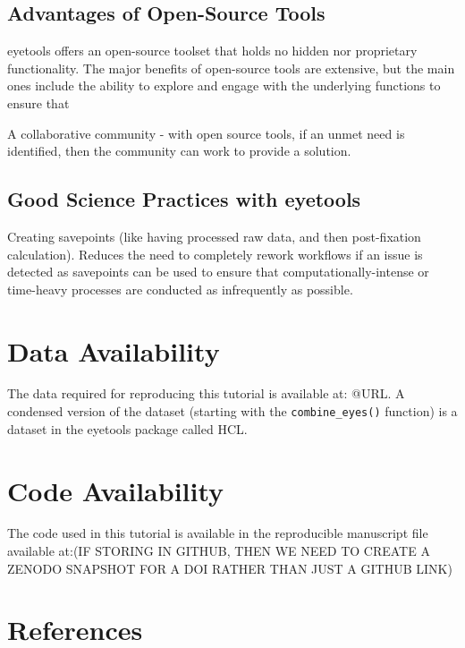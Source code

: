 \documentclass[
  man,
  floatsintext,
  longtable,
  nolmodern,
  notxfonts,
  notimes,
  colorlinks=true,linkcolor=blue,citecolor=blue,urlcolor=blue]{apa7}
\begin{document}
\subsection{Advantages of Open-Source
Tools}\label{advantages-of-open-source-tools}

eyetools offers an open-source toolset that holds no hidden nor
proprietary functionality. The major benefits of open-source tools are
extensive, but the main ones include the ability to explore and engage
with the underlying functions to ensure that

A collaborative community - with open source tools, if an unmet need is
identified, then the community can work to provide a solution.

\subsection{Good Science Practices with
eyetools}\label{good-science-practices-with-eyetools}

Creating savepoints (like having processed raw data, and then
post-fixation calculation). Reduces the need to completely rework
workflows if an issue is detected as savepoints can be used to ensure
that computationally-intense or time-heavy processes are conducted as
infrequently as possible.

\section{Data Availability}\label{data-availability}

The data required for reproducing this tutorial is available at: @URL. A
condensed version of the dataset (starting with the
\texttt{combine\_eyes()} function) is a dataset in the eyetools package
called HCL.

\section{Code Availability}\label{code-availability}

The code used in this tutorial is available in the reproducible
manuscript file available at:(IF STORING IN GITHUB, THEN WE NEED TO
CREATE A ZENODO SNAPSHOT FOR A DOI RATHER THAN JUST A GITHUB LINK)

\section{References}\label{references}
\end{document}
